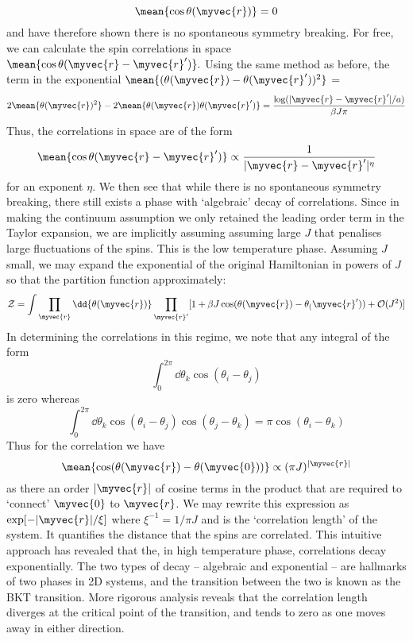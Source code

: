  \[
 \mean{\cos \theta(\myvec{r})} = 0
 \]
 and have therefore shown there is no spontaneous symmetry breaking. For free, we can calculate the spin correlations in space $\mean{\cos \theta(\myvec{r} - \myvec{r}')}.$ Using the same method as before, the term in the exponential $\mean{(\theta(\myvec{r}) - \theta(\myvec{r}'))^2}$ = 
 \[
 2\mean{\theta(\myvec{r})^2} - 2\mean{\theta(\myvec{r})\theta(\myvec{r}')} =  \frac{\log(|\myvec{r} - \myvec{r}'|/a)}{\beta J  \pi}
 \]
 Thus, the correlations in space are of the form
\[
\mean{\cos \theta (\myvec{r} - \myvec{r}')} \propto \frac{1}{|\myvec{r}- \myvec{r}'|^{\eta}}
\]
for an exponent $\eta$. We then see that while there is no spontaneous symmetry breaking, there still exists a phase with `algebraic' decay of correlations. Since in making the continuum assumption we only retained the leading order term in the Taylor expansion, we are implicitly assuming assuming large $J$ that penalises large fluctuations of the spins. This is the low temperature phase. Assuming $J$ small, we may expand the exponential of the original Hamiltonian in powers of $J$ so that the partition function approximately: 
\[
\mathcal{Z} = \int  \prod_{\myvec{r}} \dd{\theta(\myvec{r})} \prod_{\myvec{r}'} [1 + \beta J \cos(\theta(\myvec{r}) - \theta_(\myvec{r}')) + \mathcal{O}(J^2
)]\]
In determining the correlations in this regime, we note that any integral of the form 
\[
\int_{0}^{2\pi} \dd{\theta_k} \cos(\theta_i -\theta_j) 
\]
is zero whereas
\[
\int_{0}^{2\pi} \dd{\theta_k} \cos(\theta_i -\theta_j)\cos(\theta_j - \theta_k)= \pi \cos(\theta_i - \theta_k)
\]
Thus for the correlation we have 
\[
\mean{\cos(\theta(\myvec{r})- \theta(\myvec{0}))} \propto (\pi J)^{|\myvec{r}|}
\]
as there an order $|\myvec{r}|$ of cosine terms in the product that are required to `connect' $\myvec{0}$ to $\myvec{r}$. 
We may rewrite this expression as $\exp[-|\myvec{r}|/\xi]$ where $\xi^{-1} = 1/\pi J$ and is the `correlation length' of the system. It quantifies the distance that the spins are correlated. This intuitive approach has revealed that the, in high temperature phase, correlations decay exponentially. The two types of decay -- algebraic and exponential -- are hallmarks of two phases in 2D systems, and the transition between the two is known as the BKT transition. More rigorous analysis reveals that the correlation length diverges at the critical point of the transition, and tends to zero as one moves away in either direction. 

